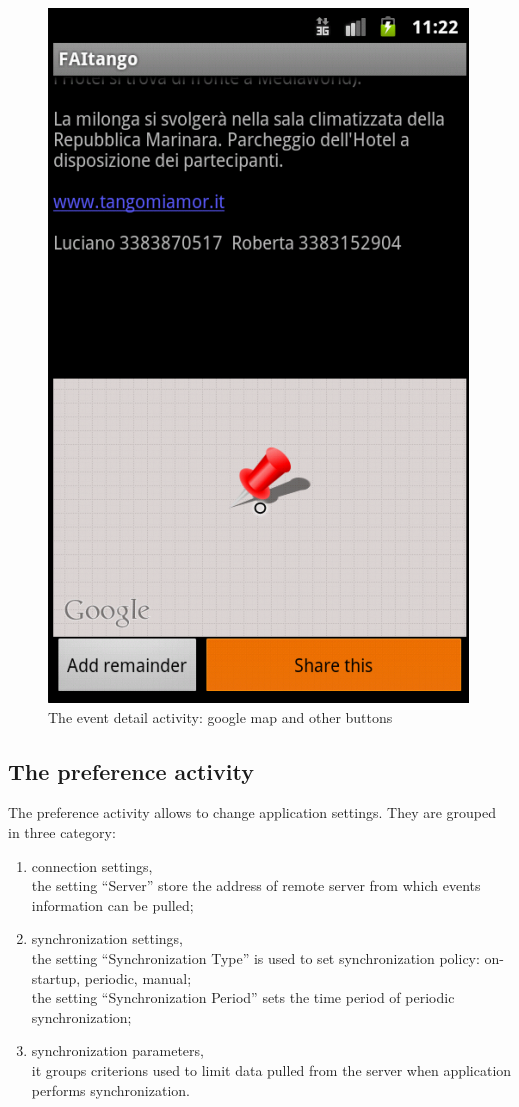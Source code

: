 \documentclass[12pt, twoside]{article}
\begin{document}
\begin{figure}[h]
\begin{center}
\includegraphics[scale=0.60]{fig/event-detail-down.png}
\end{center}
\caption{The event detail activity: google map and other buttons}
\label{fig:eventdetaildown}
\end{figure}

\subsection{The preference activity}

The preference activity allows to change application settings. They are grouped in three category:
\begin{enumerate}
	\item	connection settings,\\
		the setting ``Server'' store the address of remote server from which events information can be pulled;
	\item synchronization settings,\\
		the setting ``Synchronization Type'' is used to set synchronization policy: on-startup, periodic, manual;\\
		the setting ``Synchronization Period'' sets the time period of periodic synchronization;
	\item synchronization parameters,\\
		it groups criterions used to limit data pulled from the server when application performs synchronization.
\end{enumerate}
\end{document}
